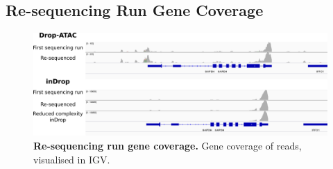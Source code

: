 \begin{appendix}
\clearpage
\subsection{Re-sequencing Run Gene Coverage}
\label{app:supp_seq_reseq_igv}
\begin{figure}[ht]
\centerfloat
\includegraphics[width=\textwidth]{./ims/seq_reseq_igv.png}
\caption[Re-sequencing run gene coverage]{\textbf{Re-sequencing run gene coverage.} Gene coverage of reads, visualised in IGV.}
\label{fig:seq_reseq_igv}
\end{figure}

\clearpage


\end{appendix}
